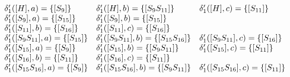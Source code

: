 \begin{align*}
	\begin{array}{lll}
		\delta'_1([H], a) = \left\{[S_9]\right\}            & \delta'_1([H], b) = \left\{[S_9S_{11}]\right\}            & \delta'_1([H], c) = \left\{[S_{11}]\right\}            \\
		\delta'_1([S_9], a) = \left\{[S_{15}]\right\}       & \delta'_1([S_9], b) = \left\{[S_{15}]\right\}                                                             \\
		\delta'_1([S_{11}], b) = \left\{[S_{16}]\right\}    & \delta'_1([S_{11}], c) = \left\{[S_{16}]\right\}                                                          \\
		\delta'_1([S_9S_{11}], a) = \left\{[S_{15}]\right\} & \delta'_1([S_9S_{11}], b) = \left\{[S_{15}S_{16}]\right\} & \delta'_1([S_9S_{11}], c) = \left\{[S_{16}]\right\}    \\
		\delta'_1([S_{15}], a) = \left\{[S_9]\right\}       & \delta'_1([S_{15}], b) = \left\{[S_9S_{11}]\right\}       & \delta'_1([S_{15}], c) = \left\{[S_{11}]\right\}       \\
		\delta'_1([S_{16}], b) = \left\{[S_{11}]\right\}    & \delta'_1([S_{16}], c) = \left\{[S_{11}]\right\}                                                          \\
		\delta'_1([S_{15}S_{16}], a) = \left\{[S_9]\right\} & \delta'_1([S_{15}S_{16}], b) = \left\{[S_9S_{11}]\right\} & \delta'_1([S_{15}S_{16}], c) = \left\{[S_{11}]\right\} \\
	\end{array}
\end{align*}
